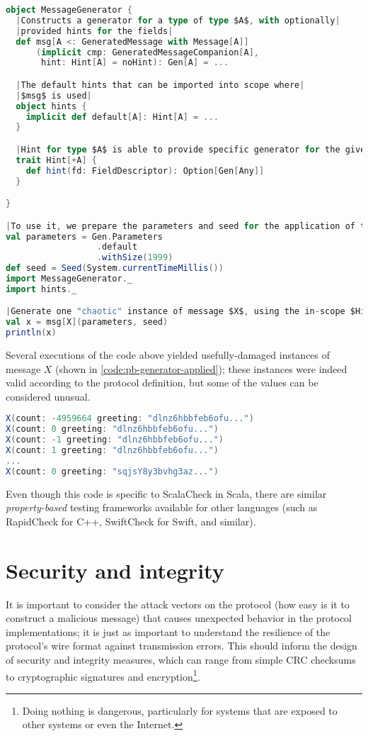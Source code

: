 \begin{lstlisting}[caption={Generator}, label={code:pb-generator}, language=Scala, escapechar=|]
object MessageGenerator {
  |Constructs a generator for a type of type $A$, with optionally|
  |provided hints for the fields|
  def msg[A <: GeneratedMessage with Message[A]]
      (implicit cmp: GeneratedMessageCompanion[A], 
       hint: Hint[A] = noHint): Gen[A] = ...

  |The default hints that can be imported into scope where|
  |$msg$ is used|
  object hints {
    implicit def default[A]: Hint[A] = ...
  }

  |Hint for type $A$ is able to provide specific generator for the given $fd$|
  trait Hint[+A] {
    def hint(fd: FieldDescriptor): Option[Gen[Any]]
  }

}

|To use it, we prepare the parameters and seed for the application of the generators|
val parameters = Gen.Parameters
                  .default
                  .withSize(1999)
def seed = Seed(System.currentTimeMillis())
import MessageGenerator._
import hints._

|Generate one "chaotic" instance of message $X$, using the in-scope $Hints[X]$|
val x = msg[X](parameters, seed)
println(x)
\end{lstlisting}

Several executions of the code above yielded usefully-damaged instances of message $X$ (shown in \autoref{code:pb-generator-applied}); these instances were indeed valid according to the protocol definition, but some of the values can be considered unusual. 

\begin{lstlisting}[caption={Generator examples}, label={code:pb-generator-applied}, language=Scala, escapechar=|]
X(count: -4959664 greeting: "dlnz6hbbfeb6ofu...")
X(count: 0 greeting: "dlnz6hbbfeb6ofu...")
X(count: -1 greeting: "dlnz6hbbfeb6ofu...")
X(count: 1 greeting: "dlnz6hbbfeb6ofu...")
...
X(count: 0 greeting: "sqjsY8y3bvhg3az...")
\end{lstlisting}

Even though this code is specific to ScalaCheck\cite{scalacheck} in Scala, there are similar \emph{property-based} testing frameworks available for other languages (such as RapidCheck\cite{rapidcheck} for C++, SwiftCheck\cite{swiftcheck} for Swift, and similar). 

\section{Security and integrity}
It is important to consider the attack vectors on the protocol (how easy is it to construct a malicious message) that causes unexpected behavior in the protocol implementations; it is just as important to understand the resilience of the protocol's wire format against transmission errors. This should inform the design of security and integrity measures, which can range from simple CRC checksums to cryptographic signatures and encryption\footnote{Doing nothing is dangerous, particularly for systems that are exposed to other systems or even the Internet.}. 

